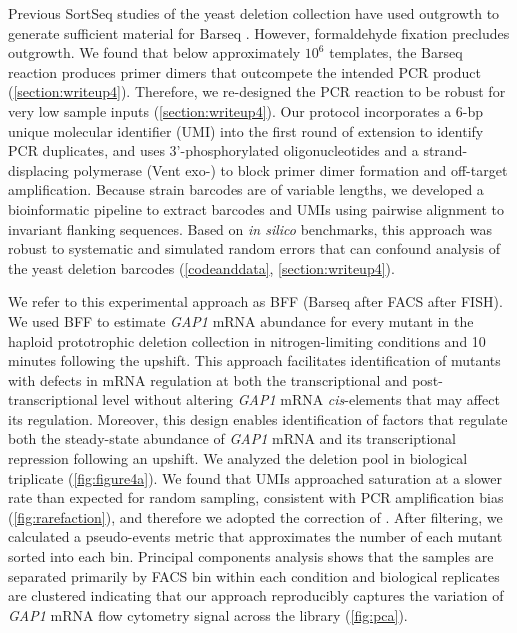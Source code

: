{Previous SortSeq studies of
the yeast deletion collection have used outgrowth 
to generate sufficient material for 
Barseq \parencite{sliva2016barcode}. However, formaldehyde fixation precludes
outgrowth. We found that below approximately $10^6$ templates, the
Barseq reaction produces primer dimers
that outcompete the intended PCR product (\autoref{section:writeup4}). 
Therefore, we re-designed the
PCR reaction \parencite{robinson2014design,smith2009quantitative} to be robust for
very low sample inputs (\autoref{section:writeup4}). Our protocol
incorporates a 6-bp unique molecular identifier (UMI) into the first
round of extension to identify PCR duplicates, 
and uses 3’-phosphorylated oligonucleotides and a
strand-displacing polymerase (Vent exo-) to block primer dimer formation and 
off-target amplification. 
Because strain barcodes are of variable lengths, 
we developed a bioinformatic pipeline to extract barcodes and UMIs 
using pairwise alignment to invariant flanking sequences.
Based on \textit{in silico} benchmarks, this
approach was robust to systematic and simulated random errors 
that can confound analysis of the yeast deletion barcodes 
(\autoref{codeanddata}, \autoref{section:writeup4}). 

We refer to this experimental approach as BFF (Barseq after FACS after FISH). 
We used BFF to estimate \textit{GAP1} mRNA abundance for every mutant in the
haploid prototrophic deletion collection
\parencite{vandersluis2014broad} in
nitrogen-limiting conditions and 10 minutes following the upshift. 
This approach facilitates identification of mutants with
defects in mRNA regulation at both the transcriptional and
post-transcriptional level without altering \textit{GAP1} mRNA 
\textit{cis}-elements that may affect its regulation. 
Moreover, this design enables identification of factors that 
regulate both the steady-state abundance of \textit{GAP1} mRNA and 
its transcriptional repression following an upshift.
We analyzed the deletion pool in biological triplicate
(\autoref{fig:figure4a}). We found that UMIs 
approached saturation at a slower rate than expected for random sampling,
consistent with PCR amplification bias 
(\autoref{fig:rarefaction}), and therefore we adopted the 
correction of \cite{fu2011counting}. After
filtering, we calculated a
pseudo-events metric that approximates the number of each mutant sorted
into each bin. 
Principal components analysis shows that the samples are 
separated primarily by FACS bin within each
condition and biological replicates are clustered indicating that our
approach reproducibly captures the variation of  \textit{GAP1} mRNA flow
cytometry signal across the library (\autoref{fig:pca}). 

}
